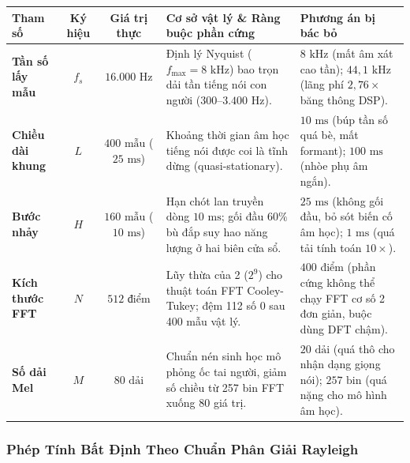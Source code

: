\documentclass[11pt,a4paper]{article}
\begin{document}
\begin{table}[h]
\centering
\small
\setlength{\tabcolsep}{3.5pt}
\begin{tabular}{lccp{5.8cm}p{4.0cm}}
\toprule
\textbf{Tham số} & \textbf{Ký hiệu} & \textbf{Giá trị thực} & \textbf{Cơ sở vật lý \& Ràng buộc phần cứng} & \textbf{Phương án bị bác bỏ} \\
\midrule
\textbf{Tần số lấy mẫu} & $f_s$ & $16.000\text{ Hz}$ & Định lý Nyquist ($f_{\max} = 8\text{ kHz}$) bao trọn dải tần tiếng nói con người ($300\text{--}3.400\text{ Hz}$). & $8\text{ kHz}$ (mất âm xát cao tần); $44{,}1\text{ kHz}$ (lãng phí $2{,}76\times$ băng thông DSP). \\
\textbf{Chiều dài khung} & $L$ & $400\text{ mẫu}$ ($25\text{ ms}$) & Khoảng thời gian âm học tiếng nói được coi là tĩnh dừng (quasi-stationary). & $10\text{ ms}$ (búp tần số quá bè, mất formant); $100\text{ ms}$ (nhòe phụ âm ngắn). \\
\textbf{Bước nhảy} & $H$ & $160\text{ mẫu}$ ($10\text{ ms}$) & Hạn chót lan truyền dòng $10\text{ ms}$; gối đầu $60\%$ bù đắp suy hao năng lượng ở hai biên cửa sổ. & $25\text{ ms}$ (không gối đầu, bỏ sót biến cố âm học); $1\text{ ms}$ (quá tải tính toán $10\times$). \\
\textbf{Kích thước FFT} & $N$ & $512\text{ điểm}$ & Lũy thừa của 2 ($2^9$) cho thuật toán FFT Cooley-Tukey; đệm 112 số 0 sau 400 mẫu vật lý. & $400$ điểm (phần cứng không thể chạy FFT cơ số 2 đơn giản, buộc dùng DFT chậm). \\
\textbf{Số dải Mel} & $M$ & $80\text{ dải}$ & Chuẩn nén sinh học mô phỏng ốc tai người, giảm số chiều từ 257 bin FFT xuống 80 giá trị. & $20\text{ dải}$ (quá thô cho nhận dạng giọng nói); $257\text{ bin}$ (quá nặng cho mô hình âm học). \\
\bottomrule
\end{tabular}
\end{table}

\subsubsection*{Phép Tính Bất Định Theo Chuẩn Phân Giải Rayleigh}
\end{document}
